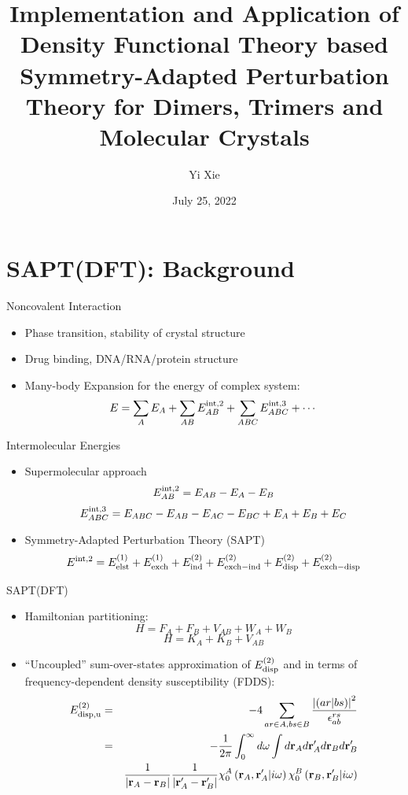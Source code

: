 \documentclass{beamer}
\title{Implementation and Application of Density Functional Theory based Symmetry-Adapted \linebreak
Perturbation Theory for Dimers, Trimers and Molecular Crystals}
\author{Yi Xie}
\date{July 25, 2022}
\begin{document}
\GTtitle

\section{SAPT(DFT): Background}

    \begin{frame}{Noncovalent Interaction}
        \begin{itemize}
            \item Phase transition, stability of crystal structure
            \item Drug binding, DNA/RNA/protein structure
            \item Many-body Expansion for the energy of complex system:
                $$E = \sum_A E_A + \sum_{AB} E^{\rm{int,2}}_{AB} + \sum_{ABC} E^{\rm{int,3}}_{ABC} +  \cdots$$
        \end{itemize} 
    \end{frame}

    \begin{frame}{Intermolecular Energies}
        \begin{itemize}
            \item Supermolecular approach 
                $$E^{\rm{int,2}}_{AB} = E_{AB} - E_A - E_B$$
                $$E^{\rm{int,3}}_{ABC} = E_{ABC} - E_{AB} - E_{AC} - E_{BC} + E_A + E_B + E_C$$
            \item Symmetry-Adapted Perturbation Theory (SAPT)
                $$E^{\rm{int,2}} = E_{\rm{elst}}^{(1)} + E_{\rm{exch}}^{(1)} + E_{\rm{ind}}^{(2)} + E_{\rm{exch-ind}}^{(2)} + E_{\rm{disp}}^{(2)} + E_{\rm{exch-disp}}^{(2)}$$
        \end{itemize}
    \end{frame}

    \begin{frame}{SAPT(DFT)}
        \begin{itemize}
            \item Hamiltonian partitioning:
                $$H = F_A + F_B + V_{AB} + W_A + W_B$$ 
                $$H = K_A + K_B + V_{AB}$$ 
            \item ``Uncoupled'' sum-over-states approximation of $E_{\rm{disp}}^{(2)}$ and in terms of frequency-dependent density susceptibility (FDDS):
                \begin{eqnarray}
                    \nonumber
                    E_{\rm{disp,u}}^{(2)} &=& -4\sum_{ar \in A,bs \in B} \frac{\left|\left(ar|bs\right)\right|^2}{\epsilon_{ab}^{rs}}\\ \nonumber
                    &=& -\frac{1}{2\pi}\int_0^\infty d\omega \int d\mathbf{r}_A d\mathbf{r}'_A d\mathbf{r}_B d\mathbf{r}'_B \\ \nonumber
                    & & \frac{1}{|\mathbf{r}_A-\mathbf{r}_B|} \frac{1}{|\mathbf{r}'_A-\mathbf{r}'_B|} \chi_0^A\left(\mathbf{r}_A,\mathbf{r}'_A|i\omega\right)\chi_0^B\left(\mathbf{r}_B,\mathbf{r}'_B|i\omega\right)
                \end{eqnarray}
        \end{itemize}
    \end{frame}
\end{document}
